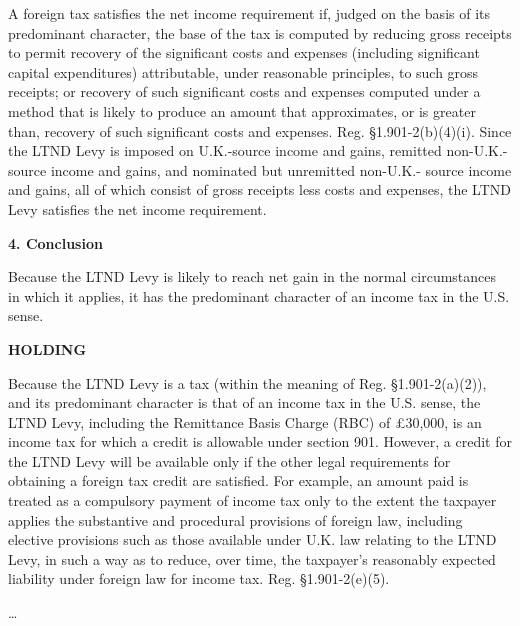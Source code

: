 \begin{select}
A foreign tax satisfies the net income requirement if, judged on the basis of its predominant character, the base of the tax is computed by reducing gross receipts to permit recovery of the significant costs and expenses (including significant capital expenditures) attributable, under reasonable principles, to such gross receipts; or recovery of such significant costs and expenses computed under a method that is likely to produce an amount that approximates, or is greater than, recovery of such significant costs and expenses. Reg. \S1.901-2(b)(4)(i). Since the LTND Levy is imposed on U.K.-source income and gains, remitted non-U.K.-source income and gains, and nominated but unremitted non-U.K.- source income and gains, all of which consist of gross receipts less costs and expenses, the LTND Levy satisfies the net income requirement.

\begin{center}
\textbf{4. Conclusion}
\end{center}

Because the LTND Levy is likely to reach net gain in the normal circumstances in which it applies, it has the predominant character of an income tax in the U.S. sense.

\begin{center}
\textbf{HOLDING}
\end{center}

Because the LTND Levy is a tax (within the meaning of Reg. \S1.901-2(a)(2)), and its predominant character is that of an income tax in the U.S. sense, the LTND Levy, including the Remittance Basis Charge (RBC) of \pounds30,000, is an income tax for which a credit is allowable under section 901. However, a credit for the LTND Levy will be available only if the other legal requirements for obtaining a foreign tax credit are satisfied. For example, an amount paid is treated as a compulsory payment of income tax only to the extent the taxpayer applies the substantive and procedural provisions of foreign law, including elective provisions such as those available under U.K. law relating to the LTND Levy, in such a way as to reduce, over time, the taxpayer's reasonably expected liability under foreign law for income tax. Reg. \S1.901-2(e)(5).

\ldots 
 
 
 \end{select}
 
 

